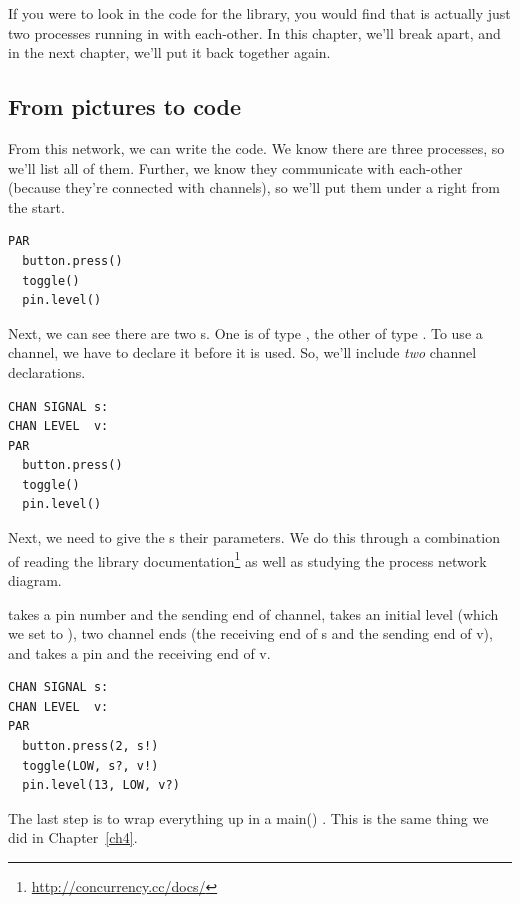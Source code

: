 If you were to look in the code for the \plumbing library, you would find that \tp is actually just two processes running in \PARallel with each-other. In this chapter, we'll break \tp apart, and in the next chapter, we'll put it back together again.

\newpage

\subsection{From pictures to code}
From this network, we can write the code. We know there are three processes, so we'll list all of them. Further, we know they communicate with each-other (because they're connected with channels), so we'll put them under a \PAR right from the start.

\vspace{3mm}
\begin{lstlisting}
PAR
  button.press()
  toggle()
  pin.level()
\end{lstlisting}

Next, we can see there are two {\CHANnel}s. One is of type \SIGNALT, the other of type \LEVELT. To use a channel, we have to declare it before it is used. So, we'll include {\em two} channel declarations.

\vspace{3mm}
\begin{lstlisting}
CHAN SIGNAL s:
CHAN LEVEL  v:
PAR
  button.press()
  toggle()
  pin.level()
\end{lstlisting}

Next, we need to give the {\PROCedure}s their parameters. We do this through a combination of reading the \plumbing library documentation\footnote{\url{http://concurrency.cc/docs/}} as well as studying the process network diagram.

\newpage

\bp takes a pin number and the sending end of channel, \toggle takes an initial level (which we set to \LOW), two channel ends (the receiving end of {\code s} and the sending end of {\code v}), and \pinlevel takes a pin and the receiving end of {\code v}.

\vspace{3mm}
\begin{lstlisting}
CHAN SIGNAL s:
CHAN LEVEL  v:
PAR
  button.press(2, s!)
  toggle(LOW, s?, v!)
  pin.level(13, LOW, v?)
\end{lstlisting}

\vspace{3mm}
The last step is to wrap everything up in a {\code main()} \PROCedure. This is the same thing we did in Chapter~\ref{ch4}.

